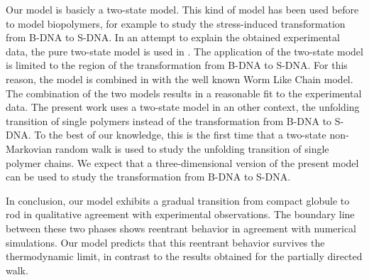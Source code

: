 \documentclass[doublecol,figures]{epl2}
\begin{document}
Our model is basicly a two-state model. This kind of model has been used before
to model biopolymers, for example to study the stress-induced transformation
from B-DNA to S-DNA. In an attempt to explain the obtained experimental data,
the pure two-state model is used in \cite{referee14}. The application of the
two-state model is limited to the region of the transformation from B-DNA to
S-DNA. For this reason, the model is combined in \cite{referee15} with the well
known Worm Like Chain model. The combination of the two models results in a
reasonable fit to the experimental data. The present work uses a two-state model
in an other context, the unfolding transition of single polymers instead of the
transformation from B-DNA to S-DNA. To the best of our knowledge, this is the
first time that a two-state non-Markovian random walk is used to study the
unfolding transition of single polymer chains. We expect that a three-dimensional version of the present model can be used to study the transformation from B-DNA to S-DNA.

In conclusion, our model exhibits a gradual transition from compact globule to
rod in qualitative agreement with experimental observations. The
boundary line between these two phases shows reentrant behavior in agreement
with numerical simulations. Our model predicts that this reentrant behavior
survives the thermodynamic limit, in contrast to the results obtained for the
partially directed walk. 
\end{document}

